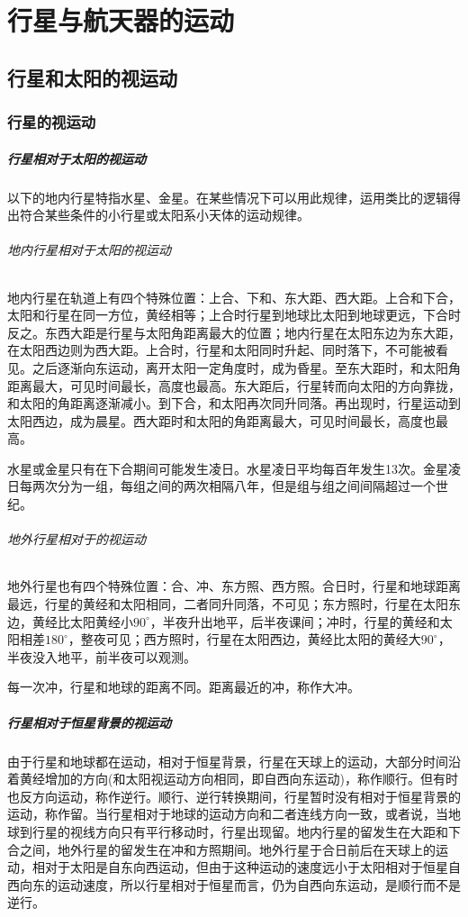 \chapter{行星与航天器的运动}
\section{行星和太阳的视运动}
\subsection{行星的视运动}
\paragraph{行星相对于太阳的视运动}
以下的地内行星特指水星、金星。在某些情况下可以用此规律，运用类比的逻辑得出符合某些条件的小行星或太阳系小天体的运动规律。
\subparagraph{地内行星相对于太阳的视运动}地内行星在轨道上有四个特殊位置：上合、下和、东大距、西大距。上合和下合，太阳和行星在同一方位，黄经相等；上合时行星到地球比太阳到地球更远，下合时反之。东西大距是行星与太阳角距离最大的位置；地内行星在太阳东边为东大距，在太阳西边则为西大距。上合时，行星和太阳同时升起、同时落下，不可能被看见。之后逐渐向东运动，离开太阳一定角度时，成为昏星。至东大距时，和太阳角距离最大，可见时间最长，高度也最高。东大距后，行星转而向太阳的方向靠拢，和太阳的角距离逐渐减小。到下合，和太阳再次同升同落。再出现时，行星运动到太阳西边，成为晨星。西大距时和太阳的角距离最大，可见时间最长，高度也最高。

水星或金星只有在下合期间可能发生凌日。水星凌日平均每百年发生13次。金星凌日每两次分为一组，每组之间的两次相隔八年，但是组与组之间间隔超过一个世纪。
\subparagraph{地外行星相对于的视运动}地外行星也有四个特殊位置：合、冲、东方照、西方照。合日时，行星和地球距离最远，行星的黄经和太阳相同，二者同升同落，不可见；东方照时，行星在太阳东边，黄经比太阳黄经小$90^\circ$，半夜升出地平，后半夜课间；冲时，行星的黄经和太阳相差$180^\circ$，整夜可见；西方照时，行星在太阳西边，黄经比太阳的黄经大$90^\circ$，半夜没入地平，前半夜可以观测。

每一次冲，行星和地球的距离不同。距离最近的冲，称作大冲。
\paragraph{行星相对于恒星背景的视运动}由于行星和地球都在运动，相对于恒星背景，行星在天球上的运动，大部分时间沿着黄经增加的方向(和太阳视运动方向相同，即自西向东运动)，称作顺行。但有时也反方向运动，称作逆行。顺行、逆行转换期间，行星暂时没有相对于恒星背景的运动，称作留。当行星相对于地球的运动方向和二者连线方向一致，或者说，当地球到行星的视线方向只有平行移动时，行星出现留。地内行星的留发生在大距和下合之间，地外行星的留发生在冲和方照期间。地外行星于合日前后在天球上的运动，相对于太阳是自东向西运动，但由于这种运动的速度远小于太阳相对于恒星自西向东的运动速度，所以行星相对于恒星而言，仍为自西向东运动，是顺行而不是逆行。

